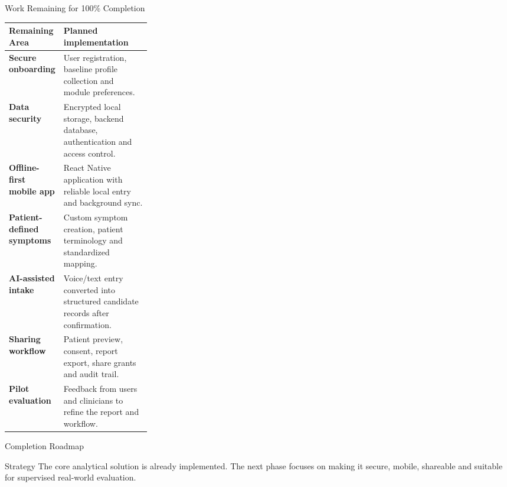 \documentclass[aspectratio=169,11pt]{beamer}
\begin{document}
\begin{frame}{Work Remaining for 100\% Completion}
  \scriptsize
  \begin{tabularx}{\linewidth}{>{\bfseries}p{0.28\linewidth} X}
    \toprule
    Remaining Area & Planned implementation \\
    \midrule
    Secure onboarding & User registration, baseline profile collection and module preferences. \\
    Data security & Encrypted local storage, backend database, authentication and access control. \\
    Offline-first mobile app & React Native application with reliable local entry and background sync. \\
    Patient-defined symptoms & Custom symptom creation, patient terminology and standardized mapping. \\
    AI-assisted intake & Voice/text entry converted into structured candidate records after confirmation. \\
    Sharing workflow & Patient preview, consent, report export, share grants and audit trail. \\
    Pilot evaluation & Feedback from users and clinicians to refine the report and workflow. \\
    \bottomrule
  \end{tabularx}
\end{frame}

\begin{frame}{Completion Roadmap}
  \begin{center}
  \end{center}

  \vspace{4mm}
  \begin{block}{Strategy}
    The core analytical solution is already implemented. The next phase focuses on making it secure, mobile, shareable and suitable for supervised real-world evaluation.
  \end{block}
\end{frame}
\end{document}
